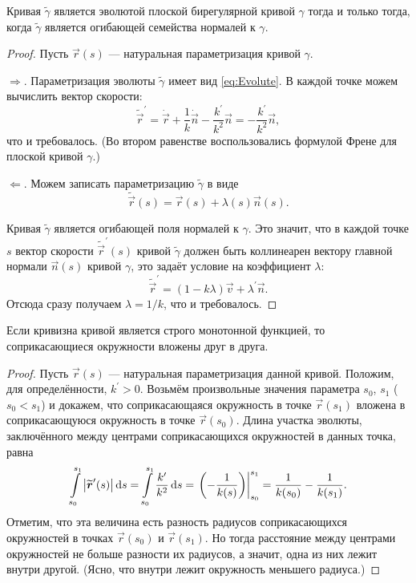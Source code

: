 \begin{proposition} \label{proposition:NormalEnvelope}
	Кривая $\widetilde{\gamma}$ является эволютой плоской бирегулярной кривой $\gamma$ тогда и только тогда, когда $\widetilde{\gamma}$ является огибающей семейства нормалей к $\gamma$.
\end{proposition}

\begin{proof}
	Пусть $\vec{r}(s)$ --- натуральная параметризация кривой $\gamma$.

	$\Rightarrow$. Параметризация эволюты $\widetilde{\gamma}$ имеет вид \eqref{eq:Evolute}. В каждой точке можем вычислить вектор скорости:\footnotemark
	\[
		\widetilde{\vec{r}}^\prime = \dot{\vec{r}} + \frac{1}{k}\dot{\vec{n}} - \frac{k^\prime}{k^2}\vec{n} = -\frac{k^\prime}{k^2}\vec{n},
	\]
	что и требовалось. (Во втором равенстве воспользовались формулой Френе для плоской кривой $\gamma$.)

	$\Leftarrow$. Можем записать параметризацию $\widetilde{\gamma}$ в виде
	\[
		\widetilde{\vec{r}}(s) = \vec{r}(s) + \lambda(s)\vec{n}(s).
	\]

	Кривая $\widetilde{\gamma}$ является огибающей поля нормалей к $\gamma$. Это значит, что в каждой точке $s$ вектор скорости $\widetilde{\vec{r}}^\prime(s)$ кривой $\widetilde{\gamma}$ должен быть коллинеарен вектору главной нормали $\vec{n}(s)$ кривой $\gamma$, это задаёт условие на коэффициент $\lambda$:
	\[
		\widetilde{\vec{r}}^\prime = (1 - k\lambda)\vec{v} + \lambda^\prime\vec{n}.
	\]
	Отсюда сразу получаем $\lambda = 1 / k$, что и требовалось.
\end{proof}


\begin{theorem}
	Если кривизна кривой является строго монотонной функцией, то соприкасающиеся окружности вложены друг в друга.
\end{theorem}

\begin{proof}
	Пусть $\vec{r}(s)$ --- натуральная параметризация данной кривой. Положим, для определённости, $k^\prime > 0$. Возьмём произвольные значения параметра $s_0$, $s_1$ ($s_0 < s_1$) и докажем, что соприкасающаяся окружность в точке $\vec{r}(s_1)$ вложена в соприкасающуюся окружность в точке $\vec{r}(s_0)$. Длина участка эволюты, заключённого между центрами соприкасающихся окружностей в данных точка, равна
	\[
		\int\limits_{s_0}^{s_1}\left\lvert\widetilde{\boldsymbol{r}}^\prime(s)\right\rvert\mathop{}\!\mathrm{d} s = \int\limits_{s_0}^{s_1}\frac{k^\prime}{k^2}\mathop{}\!\mathrm{d} s = \left.\left(-\frac{1}{k(s)}\right)\right|_{s_0}^{s_1} = \frac{1}{k(s_0)} - \frac{1}{k(s_1)}.
	\]
	Отметим, что эта величина есть разность радиусов соприкасающихся окружностей в точках $\vec{r}(s_0)$ и $\vec{r}(s_1)$. Но тогда расстояние между центрами окружностей не больше разности их радиусов, а значит, одна из них лежит внутри другой. (Ясно, что внутри лежит окружность меньшего радиуса.)
\end{proof}

